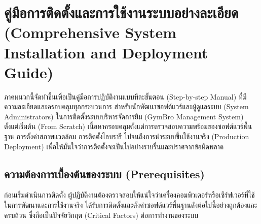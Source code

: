 \appendix
\chapter{คู่มือการติดตั้งและการใช้งานระบบอย่างละเอียด (Comprehensive System Installation and Deployment Guide)}

ภาคผนวกนี้จัดทำขึ้นเพื่อเป็นคู่มือการปฏิบัติงานแบบทีละขั้นตอน (Step-by-step Manual) ที่มีความละเอียดและครอบคลุมทุกกระบวนการ สำหรับนักพัฒนาซอฟต์แวร์และผู้ดูแลระบบ (System Administrators) ในการติดตั้งระบบบริหารจัดการยิม (GymBro Management System) ตั้งแต่เริ่มต้น (From Scratch) เนื้อหาครอบคลุมตั้งแต่การตรวจสอบความพร้อมของซอฟต์แวร์พื้นฐาน การตั้งค่าสภาพแวดล้อม การติดตั้งไลบรารี ไปจนถึงการนำระบบขึ้นใช้งานจริง (Production Deployment) เพื่อให้มั่นใจว่าการติดตั้งจะเป็นไปอย่างราบรื่นและปราศจากข้อผิดพลาด

\section{ความต้องการเบื้องต้นของระบบ (Prerequisites)}
ก่อนเริ่มดำเนินการติดตั้ง ผู้ปฏิบัติงานต้องตรวจสอบให้แน่ใจว่าเครื่องคอมพิวเตอร์หรือเซิร์ฟเวอร์ที่ใช้ในการพัฒนาและการใช้งานจริง ได้รับการติดตั้งและตั้งค่าซอฟต์แวร์พื้นฐานดังต่อไปนี้อย่างถูกต้องและครบถ้วน ซึ่งถือเป็นปัจจัยวิกฤต (Critical Factors) ต่อการทำงานของระบบ

